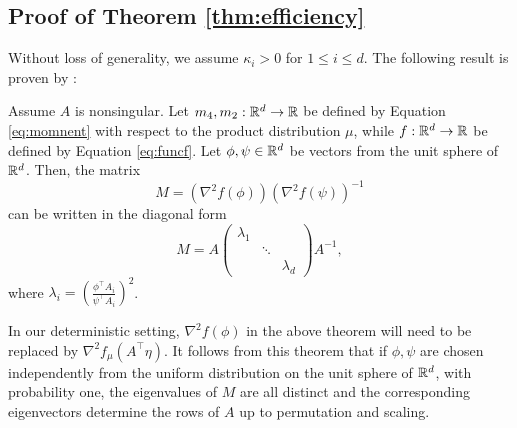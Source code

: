 \subsection{Proof of Theorem \ref{thm:efficiency}}
\label{subsec:ProofEfficiency}
Without loss of generality, we assume $\kappa_i>0$ for $1\le i \le d$. The following result is proven by \citet{DHsu2012}:
\begin{thm}
Assume $A$ is nonsingular. 
Let $m_4,m_2:\mathbb{R}^d \rightarrow \mathbb{R}$ be defined by Equation \eqref{eq:momnent} with respect to the product distribution $\mu$,
	while $f: \mathbb{R}^d \rightarrow \mathbb{R}$ be defined by Equation \eqref{eq:funcf}.
Let $\phi,\psi\in \mathbb{R}^d$ be vectors from the unit sphere of $\mathbb{R}^d$. Then, 
	the matrix
\begin{equation}
\label{eq:M}
M =(\nabla^2f(\phi))(\nabla^2f(\psi))^{-1} 
\end{equation}
can be written in the diagonal form
\begin{equation}
\label{eq:M2}
M = A 
\left(
\begin{array}{ccc}
\lambda_1 & & \\ %
    & \ddots & \\
    & & \lambda_d %
\end{array} 
\right) 
A^{-1},
\end{equation}
where $\lambda_i = \left(\frac{\phi^{\top}A_i}{\psi^{\top}A_i}\right)^2$.
\end{thm}

In our deterministic setting, $\nabla^2f(\phi)$ in the above theorem will need to be replaced by $\nabla^2f_{\mu}(A^{\top}\eta)$.
It follows from this theorem that 
if $\phi,\psi$ are chosen independently from the uniform distribution on the unit sphere of $\mathbb{R}^d$, with probability one,
the eigenvalues of  $M$ are all distinct and the corresponding eigenvectors
determine the rows of $A$ up to permutation and scaling.

